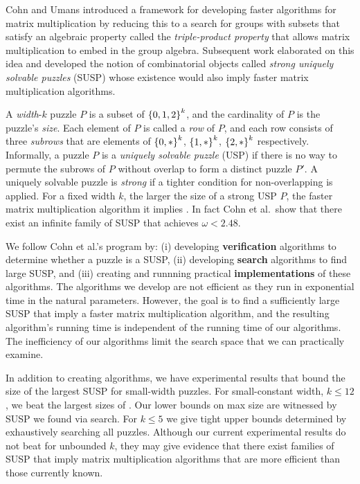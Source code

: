 \documentclass[11pt]{article}
\begin{document}

Cohn and Umans \cite{cu03} introduced a framework for developing
faster algorithms for matrix multiplication by reducing this 
to a search for groups with subsets that satisfy an algebraic
property called the \emph{triple-product property} that allows matrix
multiplication to embed in the group algebra.  Subsequent work
\cite{cksu05} elaborated on this idea and developed the notion of
combinatorial objects called \emph{strong uniquely solvable puzzles}
(SUSP) whose existence would also imply faster matrix multiplication
algorithms.

A \emph{width}-$k$ puzzle $P$ is a subset of $\left\{ 0,1,2 \right\}^k$,
and the cardinality of $P$ is the puzzle's \emph{size}.  Each element
of $P$ is called a \emph{row} of $P$, and each row consists of three
\emph{subrows} that are elements of $\left\{ 0,* \right\}^k$, $\left\{ 1,* \right\}^k$,
$\left\{ 2,* \right\}^k$ respectively.  Informally, a puzzle $P$ is a
\emph{uniquely solvable puzzle} (USP) if there is no way to permute
the subrows of $P$ without overlap to form a distinct puzzle $P'$.  A
uniquely solvable puzzle is \emph{strong} if a tighter condition for
non-overlapping is applied. For a fixed
width $k$, the larger the size of a strong USP $P$, the faster matrix
multiplication algorithm it implies \cite{cksu05}.  In fact Cohn et
al.~show that there exist an infinite family of SUSP that achieves
$\omega < 2.48$.


We follow Cohn et al.'s program by: (i) developing \textbf{verification}
algorithms to determine whether a puzzle is a SUSP, (ii) developing
\textbf{search} algorithms to find large SUSP, and (iii) creating and
runnning practical \textbf{implementations} of these algorithms.  The
algorithms we develop are not efficient as they run in exponential
time in the natural parameters.  However, the goal is to find a
sufficiently large SUSP that imply a faster matrix
multiplication algorithm, and the resulting algorithm's running time
is independent of the running time of our algorithms.  The
inefficiency of our algorithms limit the search space that
we can practically examine.


In addition to creating algorithms, we have experimental results that
bound the size of the largest SUSP for small-width puzzles.  For
small-constant width, $k \le 12$, we beat the largest sizes of
\cite[Proposition 3.8]{cksu05}.  Our lower bounds on max size are
witnessed by SUSP we found via search.  For $k \le 5$ we give tight
upper bounds determined by exhaustively searching all puzzles.
Although our current experimental results do not beat \cite{cksu05}
for unbounded $k$, they may give evidence that there exist families of
SUSP that imply matrix multiplication algorithms that are more
efficient than those currently known.
\end{document}
